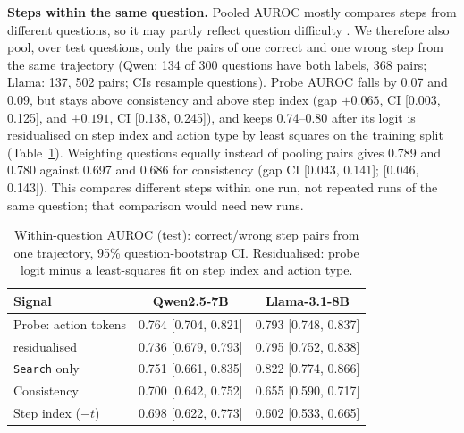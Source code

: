 \documentclass[10pt,twocolumn]{article}
\begin{document}
\textbf{Steps within the same question.} Pooled AUROC mostly compares steps from different questions, so it may
partly reflect question difficulty \citep{esfandyari2026disentangling}. We therefore also pool, over test questions,
only the pairs of one correct and one wrong step from the same trajectory (Qwen: 134 of 300 questions have both
labels, 368 pairs; Llama: 137, 502 pairs; CIs resample questions). Probe AUROC falls by 0.07 and 0.09, but stays
above consistency and above step index (gap $+0.065$, CI [0.003, 0.125], and $+0.191$, CI [0.138, 0.245]), and keeps
0.74--0.80 after its logit is residualised on step index and action type by least squares on the training split
(Table~\ref{tab:within}). Weighting questions equally instead of pooling pairs gives 0.789 and 0.780 against 0.697
and 0.686 for consistency (gap CI [0.043, 0.141]; [0.046, 0.143]). This compares different steps within one run, not repeated runs of the
same question; that comparison would need new runs.

\begin{table}[t]
\centering\small
\caption{Within-question AUROC (test): correct/wrong step pairs from one trajectory, 95\% question-bootstrap CI.
Residualised: probe logit minus a least-squares fit on step index and action type.}
\label{tab:within}
\footnotesize\setlength{\tabcolsep}{3pt}
\begin{tabular}{@{}lcc@{}}
\toprule
Signal & Qwen2.5-7B & Llama-3.1-8B \\
\midrule
Probe: action tokens & 0.764 [0.704, 0.821] & 0.793 [0.748, 0.837] \\
\quad residualised & 0.736 [0.679, 0.793] & 0.795 [0.752, 0.838] \\
\quad \texttt{Search} only & 0.751 [0.661, 0.835] & 0.822 [0.774, 0.866] \\
Consistency & 0.700 [0.642, 0.752] & 0.655 [0.590, 0.717] \\
Step index ($-t$) & 0.698 [0.622, 0.773] & 0.602 [0.533, 0.665] \\
\bottomrule
\end{tabular}
\end{table}
\end{document}
